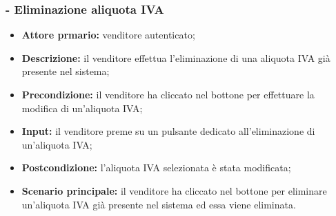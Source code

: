 \stepsubUserCase
\subsubsection{- Eliminazione aliquota IVA}
\begin{itemize}
    \item \textbf{Attore prmario:} venditore autenticato;
    \item \textbf{Descrizione:} il venditore effettua l'eliminazione di una aliquota IVA già presente nel sistema;
    \item \textbf{Precondizione:} il venditore ha cliccato nel bottone per effettuare la modifica di un’aliquota IVA;
    \item \textbf{Input:} il venditore preme su un pulsante dedicato all'eliminazione di un'aliquota IVA;
    \item \textbf{Postcondizione:} l'aliquota IVA selezionata è stata modificata;
    \item \textbf{Scenario principale:} il venditore ha cliccato nel bottone per eliminare un’aliquota IVA già presente nel sistema ed essa viene eliminata.
\end{itemize}

\stepUserCase
